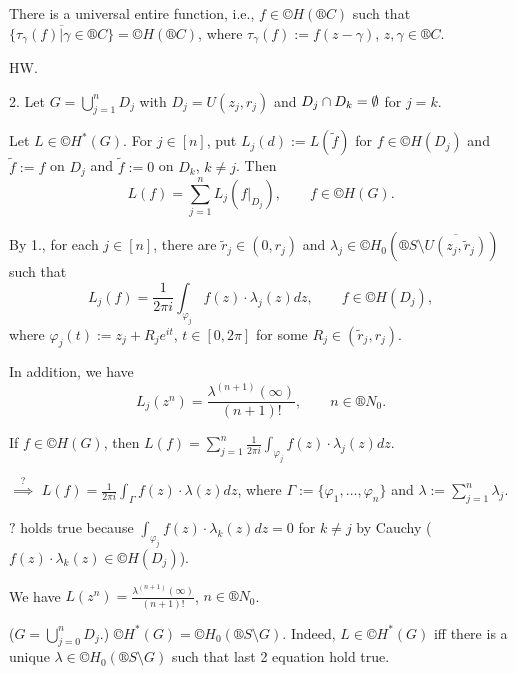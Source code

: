 \documentclass[12pt]{article}					%
\begin{document}
\begin{priklad}[Birkhoff]
	There is a universal entire function, i.e., $f \in ©H(®C)$ such that $\overline{\{τ_γ(f) | γ \in ®C\}} = ©H(®C)$, where $τ_γ(f) := f(z - γ)$, $z, γ \in ®C$.

	\begin{reseni}
		HW.
	\end{reseni}
\end{priklad}

\begin{poznamka}
	2. Let $G = \bigcup_{j=1}^n D_j$ with $D_j = U(z_j, r_j)$ and $D_j \cap D_k = \emptyset$ for $j = k$.

	Let $L \in ©H^*(G)$. For $j \in [n]$, put $L_j(d) := L(\tilde f)$ for $f \in ©H(D_j)$ and $\tilde f := f$ on $D_j$ and $\tilde f := 0$ on $D_k$, $k ≠ j$. Then
	$$ L(f) = \sum_{j=1}^n L_j(f|_{D_j}), \qquad f \in ©H(G). $$

	By 1., for each $j \in [n]$, there are $\tilde r_j \in (0, r_j)$ and $λ_j \in ©H_0(®S \setminus \overline{U(z_j, \tilde r_j)})$ such that
	$$ L_j(f) = \frac{1}{2πi} \int_{φ_j} f(z)·λ_j(z) dz, \qquad f \in ©H(D_j), $$
	where $φ_j(t) := z_j + R_j e^{it}$, $t \in [0, 2π]$ for some $R_j \in (\tilde r_j, r_j)$.

	In addition, we have
	$$ L_j(z^n) = \frac{λ^{(n+1)}(∞)}{(n+1)!}, \qquad n \in ®N_0. $$

	If $f \in ©H(G)$, then $L(f) = \sum_{j=1}^n \frac{1}{2πi} \int_{φ_j} f(z)·λ_j(z) dz$.

	$\overset?\implies$ $L(f) = \frac{1}{2πi} \int_Γ f(z)·λ(z) dz$, where $Γ := \{φ_1, …, φ_n\}$ and $λ := \sum_{j=1}^n λ_j$.

	$?$ holds true because $\int_{φ_j} f(z) · λ_k(z) dz = 0$ for $k ≠ j$ by Cauchy ($f(z)·λ_k(z) \in ©H(D_j)$).

	We have $L(z^n) = \frac{λ^{(n+1)}(∞)}{(n+1)!}$, $n \in ®N_0$.
\end{poznamka}

\begin{poznamka}[Conclusion]
	($G = \bigcup_{j=0}^n D_j$.) $©H^*(G) = ©H_0(®S \setminus G)$. Indeed, $L \in ©H^*(G)$ iff there is a unique $λ \in ©H_0(®S \setminus G)$ such that last 2 equation hold true.
\end{poznamka}
\end{document}

